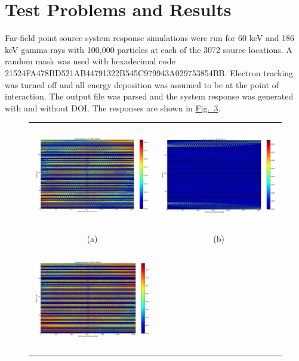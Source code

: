 \documentclass[10pt]{article}
\begin{document}
\section{Test Problems and Results}

Far-field point source system response simulations were run for 60 keV and 186 keV gamma-rays with 100,000 particles at each of the 3072 source locations. A random mask was used with hexadecimal code 21524FA478BD521AB44791322B545C979943A029753854BB. Electron tracking was turned off and all energy deposition was assumed to be at the point of interaction. The output file was parsed and the system response was generated with and without DOI. The responses are shown in \hyperlink{fig3}{Fig.~3}.

\begin{figure}[htb!]
\hypertarget{fig3}{}
\centering
\begin{tabular}{cc}
	\includegraphics[height=130pt]{Figures/SystemResponse_60_noDOI.png} & 
	\includegraphics[height=130pt]{Figures/SystemResponse_60_DOI.png} \\ [-0.5ex]
	\scriptsize{(a)} & \scriptsize{(b)} \\ [1ex]
	\includegraphics[height=130pt]{Figures/SystemResponse_186_noDOI.png} & 

\end{tabular}
\end{figure}
\end{document}
